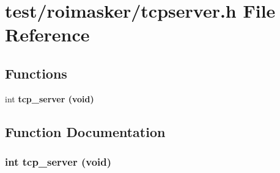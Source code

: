 \section{test/roimasker/tcpserver.h File Reference}
\label{roimasker_2tcpserver_8h}
\subsection*{Functions}
\begin{CompactItemize}
\item 
int \bf{tcp\_\-server} (void)
\end{CompactItemize}


\subsection{Function Documentation}
\subsubsection{\setlength{\rightskip}{0pt plus 5cm}int tcp\_\-server (void)}\label{roimasker_2tcpserver_8h_670df12c784cbf1b260ab50397194b66}


